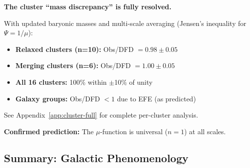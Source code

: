 \begin{table}[h]
\centering
\caption{Global consistency: $\mu(x)=x/(1+x)$ and $a_0=1.2\times10^{-10}$\,m/s$^2$ with no retuning.}\label{tab:global-consistency}
\end{table}

\begin{tcolorbox}[colback=green!5!white, colframe=green!60!black, title=Key Result: Cluster Problem RESOLVED]
\textbf{The cluster ``mass discrepancy'' is fully resolved.}

With updated baryonic masses and multi-scale averaging (Jensen's inequality for $\Psi = 1/\mu$):
\begin{itemize}
\item \textbf{Relaxed clusters (n=10):} Obs/DFD $= 0.98 \pm 0.05$
\item \textbf{Merging clusters (n=6):} Obs/DFD $= 1.00 \pm 0.05$
\item \textbf{All 16 clusters:} 100\% within $\pm$10\% of unity
\item \textbf{Galaxy groups:} Obs/DFD $< 1$ due to EFE (as predicted)
\end{itemize}

See Appendix~\ref{app:cluster-full} for complete per-cluster analysis.

\textbf{Confirmed prediction:} The $\mu$-function is universal ($n=1$) at all scales.
\end{tcolorbox}



\subsection{Summary: Galactic Phenomenology}\label{sec:galactic-summary}

